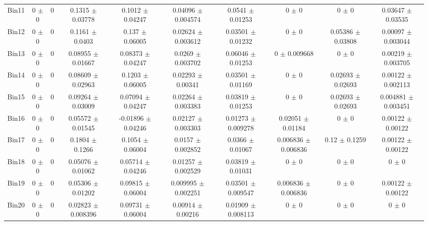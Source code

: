 \begin{tabular}{@{\extracolsep{4pt}}lccccccccc@{}}
     Bin11 & 0 $\pm$ 0 & 0 & 0.1315 $\pm$ 0.03778 & 0.1012 $\pm$ 0.04247 & 0.04096 $\pm$ 0.004574 & 0.0541 $\pm$ 0.01253 & 0 $\pm$ 0 & 0 $\pm$ 0 & 0.03647 $\pm$ 0.03535 \\ 
     Bin12 & 0 $\pm$ 0 & 0 & 0.1161 $\pm$ 0.0403 & 0.137 $\pm$ 0.06005 & 0.02624 $\pm$ 0.003612 & 0.03501 $\pm$ 0.01232 & 0 $\pm$ 0 & 0.05386 $\pm$ 0.03808 & 0.00097 $\pm$ 0.003044 \\ 
     Bin13 & 0 $\pm$ 0 & 0 & 0.08955 $\pm$ 0.01667 & 0.08373 $\pm$ 0.04247 & 0.0269 $\pm$ 0.003702 & 0.06046 $\pm$ 0.01253 & 0 $\pm$ 0.009668 & 0 $\pm$ 0 & 0.00219 $\pm$ 0.003705 \\ 
     Bin14 & 0 $\pm$ 0 & 0 & 0.08609 $\pm$ 0.02963 & 0.1203 $\pm$ 0.06005 & 0.02293 $\pm$ 0.00341 & 0.03501 $\pm$ 0.01169 & 0 $\pm$ 0 & 0.02693 $\pm$ 0.02693 & 0.00122 $\pm$ 0.002113 \\ 
     Bin15 & 0 $\pm$ 0 & 0 & 0.09264 $\pm$ 0.03009 & 0.07094 $\pm$ 0.04247 & 0.02264 $\pm$ 0.003383 & 0.03819 $\pm$ 0.01253 & 0 $\pm$ 0 & 0.02693 $\pm$ 0.02693 & 0.004881 $\pm$ 0.003451 \\ 
     Bin16 & 0 $\pm$ 0 & 0 & 0.05572 $\pm$ 0.01545 & -0.01896 $\pm$ 0.04246 & 0.02127 $\pm$ 0.003303 & 0.01273 $\pm$ 0.009278 & 0.02051 $\pm$ 0.01184 & 0 $\pm$ 0 & 0.00122 $\pm$ 0.00122 \\ 
     Bin17 & 0 $\pm$ 0 & 0 & 0.1804 $\pm$ 0.1266 & 0.1054 $\pm$ 0.06004 & 0.0157 $\pm$ 0.002852 & 0.0366 $\pm$ 0.01067 & 0.006836 $\pm$ 0.006836 & 0.12 $\pm$ 0.1259 & 0.00122 $\pm$ 0.00122 \\ 
     Bin18 & 0 $\pm$ 0 & 0 & 0.05076 $\pm$ 0.01062 & 0.05714 $\pm$ 0.04246 & 0.01257 $\pm$ 0.002529 & 0.03819 $\pm$ 0.01031 & 0 $\pm$ 0 & 0 $\pm$ 0 & 0 $\pm$ 0 \\ 
     Bin19 & 0 $\pm$ 0 & 0 & 0.05306 $\pm$ 0.01202 & 0.09815 $\pm$ 0.06004 & 0.009995 $\pm$ 0.002251 & 0.03501 $\pm$ 0.009547 & 0.006836 $\pm$ 0.006836 & 0 $\pm$ 0 & 0.00122 $\pm$ 0.00122 \\ 
     Bin20 & 0 $\pm$ 0 & 0 & 0.02823 $\pm$ 0.008396 & 0.09731 $\pm$ 0.06004 & 0.00914 $\pm$ 0.00216 & 0.01909 $\pm$ 0.008113 & 0 $\pm$ 0 & 0 $\pm$ 0 & 0 $\pm$ 0 \\ 
\hline\hline
  \end{tabular}
